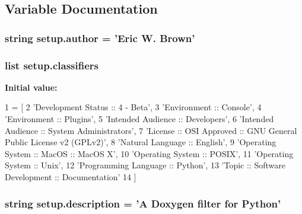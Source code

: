 \subsection{Variable Documentation}
\hypertarget{namespacesetup_ac83393287a89728d636e4ae9f4ac914f}{
\subsubsection[{author}]{\setlength{\rightskip}{0pt plus 5cm}string setup.\-author = 'Eric W. Brown'}}\label{namespacesetup_ac83393287a89728d636e4ae9f4ac914f}
\hypertarget{namespacesetup_a2d96dddd66b7833bbb2db38dbbe55a02}{
\subsubsection[{classifiers}]{\setlength{\rightskip}{0pt plus 5cm}list setup.\-classifiers}}\label{namespacesetup_a2d96dddd66b7833bbb2db38dbbe55a02}
{\bfseries Initial value\-:}
\begin{DoxyCode}
1 = [
2         \textcolor{stringliteral}{'Development Status :: 4 - Beta'},
3         \textcolor{stringliteral}{'Environment :: Console'},
4         \textcolor{stringliteral}{'Environment :: Plugins'},
5         \textcolor{stringliteral}{'Intended Audience :: Developers'},
6         \textcolor{stringliteral}{'Intended Audience :: System Administrators'},
7         \textcolor{stringliteral}{'License :: OSI Approved :: GNU General Public License v2 (GPLv2)'},
8         \textcolor{stringliteral}{'Natural Language :: English'},
9         \textcolor{stringliteral}{'Operating System :: MacOS :: MacOS X'},
10         \textcolor{stringliteral}{'Operating System :: POSIX'},
11         \textcolor{stringliteral}{'Operating System :: Unix'},
12         \textcolor{stringliteral}{'Programming Language :: Python'},
13         \textcolor{stringliteral}{'Topic :: Software Development :: Documentation'}
14     ]
\end{DoxyCode}
\hypertarget{namespacesetup_ade8aa54df2083113a10326ea2fe7934b}{
\subsubsection[{description}]{\setlength{\rightskip}{0pt plus 5cm}string setup.\-description = 'A Doxygen filter for Python'}}\label{namespacesetup_ade8aa54df2083113a10326ea2fe7934b}
